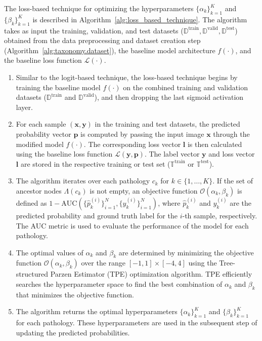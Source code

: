 \documentclass[review,1p,times,numbers]{elsarticle}
\begin{document}
The loss-based technique for optimizing the hyperparameters $\{\alpha_k\}_{k=1}^K$ and $\{\beta_k\}_{k=1}^K$ is described in Algorithm~\ref{alg:loss_based_technique}. The algorithm takes as input the training, validation, and test datasets ($\mathbb{D}^{\text{train}}, \mathbb{D}^{\text{valid}}, \mathbb{D}^{\text{test}}$) obtained from the data preprocessing and dataset creation step (Algorithm~\ref{alg:taxonomy.dataset}), the baseline model architecture $f(\cdot)$, and the baseline loss function $\mathcal{L}(\cdot)$.
\begin{enumerate}
    \item Similar to the logit-based technique, the loss-based technique begins by training the baseline model $f(\cdot)$ on the combined training and validation datasets ($\mathbb{D}^{\text{train}}$ and $\mathbb{D}^{\text{valid}}$), and then dropping the last sigmoid activation layer.
    \item For each sample $(\mathbf{x}, \mathbf{y})$ in the training and test datasets, the predicted probability vector $\mathbf{p}$ is computed by passing the input image $\mathbf{x}$ through the modified model $f(\cdot)$. The corresponding loss vector $\mathbf{l}$ is then calculated using the baseline loss function $\mathcal{L}(\mathbf{y}, \mathbf{p})$. The label vector $\mathbf{y}$ and loss vector $\mathbf{l}$ are stored in the respective training or test set ($\mathbb{T}^{\text{train}}$ or $\mathbb{T}^{\text{test}}$).
    \item The algorithm iterates over each pathology $c_k$ for $k \in \{1, \dots, K\}$. If the set of ancestor nodes $\Lambda(c_k)$ is not empty, an objective function $\mathcal{O}(\alpha_k, \beta_k)$ is defined as $1 - \text{AUC}(\{\hat{p}_k^{(i)}\}_{i=1}^N, \{y_k^{(i)}\}_{i=1}^N)$, where $\hat{p}_k^{(i)}$ and $y_k^{(i)}$ are the predicted probability and ground truth label for the $i$-th sample, respectively. The AUC metric is used to evaluate the performance of the model for each pathology.
    \item The optimal values of $\alpha_k$ and $\beta_k$ are determined by minimizing the objective function $\mathcal{O}(\alpha_k, \beta_k)$ over the range $[-1, 1] \times [-4, 4]$ using the Tree-structured Parzen Estimator (TPE) optimization algorithm. TPE efficiently searches the hyperparameter space to find the best combination of $\alpha_k$ and $\beta_k$ that minimizes the objective function.
    \item The algorithm returns the optimal hyperparameters $\{\alpha_k\}_{k=1}^K$ and $\{\beta_k\}_{k=1}^K$ for each pathology. These hyperparameters are used in the subsequent step of updating the predicted probabilities.
\end{enumerate}
\end{document}
